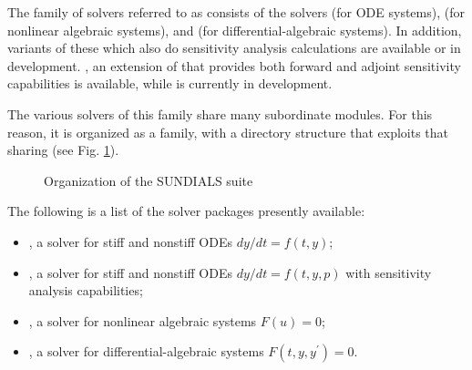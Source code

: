 %
The family of solvers referred to as {\sundials} consists of the solvers
{\cvode} (for ODE systems), {\kinsol} (for nonlinear algebraic
systems), and {\ida} (for differential-algebraic systems).  In addition,
variants of these which also do sensitivity analysis calculations are
available or in development. {\cvodes}, an extension of {\cvode} that
provides both forward and adjoint sensitivity capabilities is available,
while {\idas} is currently in development.

The various solvers of this family share many subordinate modules.
For this reason, it is organized as a family, with a directory
structure that exploits that sharing (see Fig. \ref{f:sunorg}).
\begin{figure}
\caption {Organization of the SUNDIALS suite}\label{f:sunorg}
\end{figure}
The following is a list of the solver packages presently available:
\begin{itemize}

\item {\cvode},  
  a solver for stiff and nonstiff ODEs $dy/dt = f(t,y)$;

\item {\cvodes},
  a solver for stiff and nonstiff ODEs $dy/dt = f(t,y,p)$
  with sensitivity analysis capabilities;

\item {\kinsol}, 
  a solver for nonlinear algebraic systems $F(u) = 0$;

\item {\ida},
  a solver for differential-algebraic systems $F(t,y,y^\prime) = 0$.

\end{itemize}
